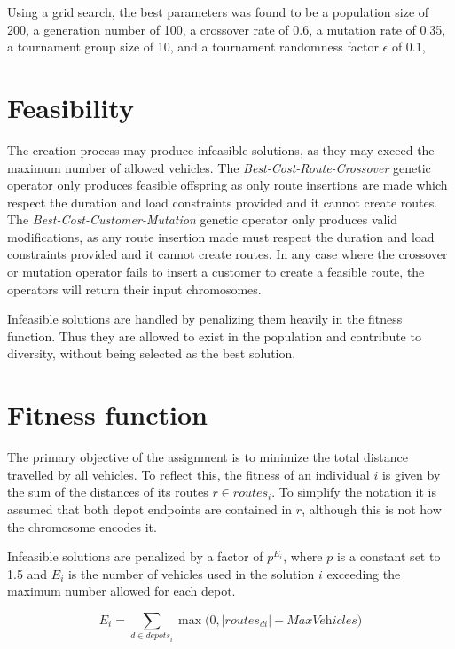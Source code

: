 \documentclass[paper=a4, fontsize=9pt]{scrartcl}
\begin{document}
\begin{multicols}{2}
Using a grid search, the best parameters was found to be a population size of 200, a generation number of 100, a crossover rate of 0.6, a mutation rate of 0.35, a tournament group size of 10, and a tournament randomness factor $\epsilon$ of 0.1, 

\section*{Feasibility}

The creation process may produce infeasible solutions, as they may exceed the maximum number of allowed vehicles. The \textit{Best-Cost-Route-Crossover} genetic operator only produces feasible offspring as only route insertions are made which respect the duration and load constraints provided and it cannot create routes. The \textit{Best-Cost-Customer-Mutation} genetic operator only produces valid modifications, as any route insertion made must respect the duration and load constraints provided and it cannot create routes. In any case where the crossover or mutation operator fails to insert a customer to create a feasible route, the operators will return their input chromosomes.

Infeasible solutions are handled by penalizing them heavily in the fitness function. Thus they are allowed to exist in the population and contribute to diversity, without being selected as the best solution.

\section*{Fitness function}

The primary objective of the assignment is to minimize the total distance travelled by all vehicles. To reflect this, the fitness of an individual $i$ is given by the sum of the distances of its routes $r \in \textit{routes}_i$. To simplify the notation it is assumed that both depot endpoints are contained in $r$, although this is not how the chromosome encodes it.

Infeasible solutions are penalized by a factor of $p^{E_i}$, where $p$ is a constant set to 1.5 and $E_i$ is the number of vehicles used in the solution $i$ exceeding the maximum number allowed for each depot.

\begin{equation}
E_i = \sum_{d \in \textit{depots}_i} \max \big(0, \vert \textit{routes}_{di} \vert - \textit{MaxVehicles} \big)
\end{equation}


\end{multicols}
\end{document}

